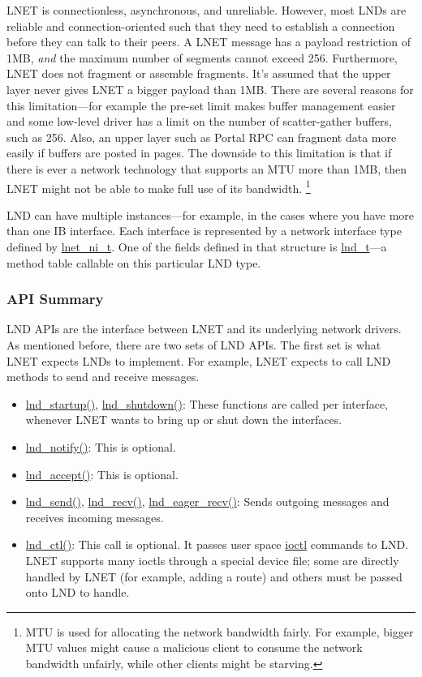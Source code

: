 LNET is connectionless, asynchronous, and unreliable. However, most LNDs are
reliable and connection-oriented such that they need to establish a connection
before they can talk to their peers. A LNET message has a payload restriction
of 1MB, \textit{and} the maximum number of segments cannot exceed 256.
Furthermore, LNET does not fragment or assemble fragments. It's assumed that
the upper layer never gives LNET a bigger payload than 1MB.  There are several
reasons for this limitation---for example the pre-set limit makes buffer
management easier and some low-level driver has a limit on the number of
scatter-gather buffers, such as 256. Also, an upper layer such as Portal RPC
can fragment data more easily if buffers are posted in pages. The downside to
this limitation is that if there is ever a network technology that supports an
MTU more than 1MB, then LNET might not be able to make full use of its
bandwidth.  \footnote{MTU is used for allocating the network bandwidth fairly.
For example, bigger MTU values might cause a malicious client to consume
the network bandwidth unfairly, while other clients might be starving.}

LND can have multiple instances---for example, in the cases where you have more
than one IB interface. Each interface is represented by a network interface
type defined by \url{lnet_ni_t}. One of the fields defined in that structure
is \url{lnd_t}---a method table callable on this particular LND type.

\subsubsection{API Summary}

LND APIs are the interface between LNET and its underlying network drivers. As
mentioned before, there are two sets of LND APIs. The first set is what LNET
expects LNDs to implement. For example, LNET expects to call LND methods to
send and receive messages. 

\begin{itemize}

\item \url{lnd_startup()}, \url{lnd_shutdown()}: These functions are called
per interface, whenever LNET wants to bring up or shut down the interfaces.

\item \url{lnd_notify()}: This is optional.

\item \url{lnd_accept()}: This is optional.

\item \url{lnd_send()}, \url{lnd_recv()}, \url{lnd_eager_recv()}: Sends
outgoing messages and receives incoming messages.

\item \url{lnd_ctl()}: This call is optional. It passes user space \url{ioctl}
commands to LND. LNET supports many ioctls through a special device file; some
are directly handled by LNET (for example, adding a route) and others must be
passed onto LND to handle.

\end{itemize}


